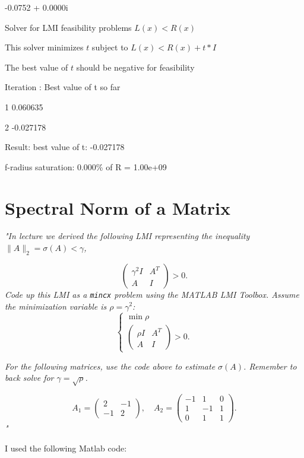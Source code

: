 \documentclass[12pt, letterpaper]{article}
\begin{document}
-0.0752 + 0.0000i 

Solver for LMI feasibility problems $L(x) < R(x)$

This solver minimizes  $t$  subject to  $L(x) < R(x) + t*I$

The best value of $t$ should be negative for feasibility

Iteration   :    Best value of t so far 

1                        0.060635

2                       -0.027178

Result:  best value of t:    -0.027178

f-radius saturation:  0.000\% of R =  1.00e+09

\section{Spectral Norm of a Matrix}

\textit{
    "In lecture we derived the following LMI representing the inequality $\|A\|_2 = \sigma(A) < \gamma$,
}

\[
\begin{pmatrix}
\gamma^2 I & A^T \\
A & I
\end{pmatrix} > 0.
\]
\textit{
Code up this LMI as a \texttt{mincx} problem using the MATLAB LMI Toolbox. Assume the minimization variable is $\rho = \gamma^2$:
}
\[
\begin{cases}
\min \rho \\
\begin{pmatrix}
\rho I & A^T \\
A & I
\end{pmatrix} > 0.
\end{cases}
\]

\textit{
For the following matrices, use the code above to estimate $\sigma(A)$. Remember to back solve for $\gamma = \sqrt{\rho}$.
}

\[
A_1 = \begin{pmatrix}
2 & -1 \\
-1 & 2
\end{pmatrix}, \quad
A_2 = \begin{pmatrix}
-1 & 1 & 0 \\
1 & -1 & 1 \\
0 & 1 & 1
\end{pmatrix}.
\] \textit{"}

I used the following Matlab code:
\end{document}
